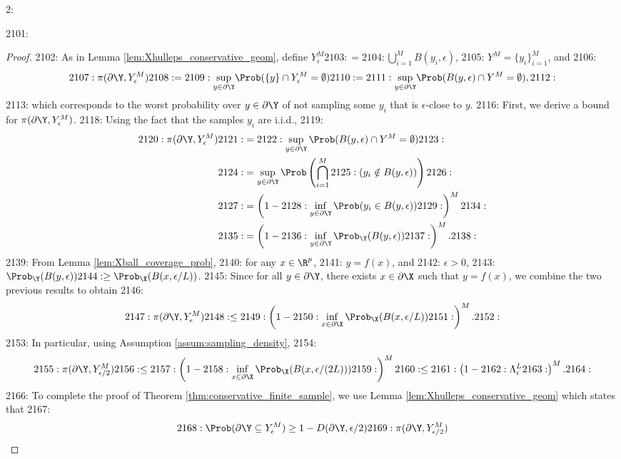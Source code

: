 2: \documentclass[12pt]{l4dc2022} %
\begin{document}
2101: \begin{proof}%
2102: As in Lemma \ref{lem:Xhulleps_conservative_geom}, define $Y_\epsilon^M
2103: 	=
2104: 	\bigcup_{i=1}^M B(y_i,\epsilon)$, 
2105: 	$Y^M=\{y_i\}_{i=1}^M$, and 
2106: $$
2107: \pi(\partial\Y,Y_\epsilon^M)
2108: =
2109: \underset{y\in\partial\Y}{\sup}\Prob(\{y\} \cap Y_\epsilon^M = \emptyset)
2110: =
2111: \underset{y\in\partial\Y}{\sup}\Prob(B(y,\epsilon) \cap Y^M = \emptyset),
2112: $$
2113: which corresponds to the worst probability over $y\in\partial\Y$ of not sampling some $y_i$ that is $\epsilon$-close to $y$. 
2116: First, we derive a bound for $\pi(\partial\Y,Y_\epsilon^M)$. 
2118: Using the fact that the samples $y_i$ are i.i.d., 
2119: \begin{align*}
2120: \pi(\partial\Y,Y_\epsilon^M) 
2121: &=
2122: \sup_{y\in\partial\Y}\Prob(B(y,\epsilon) \cap Y^M = \emptyset)
2123: \\
2124: &= \sup_{y\in\partial\Y}\Prob\left(\bigcap_{i=1}^M
2125: (y_i\notin B(y,\epsilon))\right)
2126: \\
2127: &= \left(1 -
2128: 	\inf_{y\in\partial\Y}\Prob(y_i\in B(y,\epsilon)) 
2129: \right)^M
2134: \\
2135: &=\left(1 -
2136: 	\inf_{y\in\partial\Y}\Prob_\Y(B(y,\epsilon)) 
2137: \right)^M.
2138: \end{align*}
2139: From Lemma \ref{lem:Xball_coverage_prob}, 
2140: for any $x\in\R^p$, 
2141: $y=f(x)$, and 
2142: $\epsilon>0$, 
2143: $\Prob_\Y(B(y,\epsilon))
2144: \geq \Prob_\X(B(x,\epsilon/L))$. 
2145: Since for all $y\in\partial\Y$, there exists $x\in\partial\X$ such that $y=f(x)$, we combine the two previous results to obtain 
2146: \begin{align*}
2147: \pi(\partial\Y,Y_\epsilon^M) 
2148: \leq 
2149: \left(1 -
2150: 	\inf_{x\in\partial\X}\Prob_\X(B(x,\epsilon/L))
2151: \right)^M.
2152: \end{align*}
2153: In particular, using Assumption \ref{assum:sampling_density}, 
2154: \begin{align*}
2155: \pi(\partial\Y,Y_{\epsilon/2}^M) 
2156: \leq 
2157: \left(1 -
2158: 	\inf_{x\in\partial\X}\Prob_\X(B(x,\epsilon/(2L)))
2159: \right)^M
2160: \leq 
2161: \left(1 -
2162: 	\Lambda_{\epsilon}^{L}
2163: \right)^M.
2164: \end{align*}
2166: To complete the proof of Theorem \ref{thm:conservative_finite_sample}, we use Lemma \ref{lem:Xhulleps_conservative_geom} which states that 
2167: $$
2168: \Prob(\partial\Y\subseteq Y_\epsilon^M) \geq 1 - D(\partial\Y,\epsilon/2)
2169: \pi(\partial\Y,Y_{\epsilon/2}^M)
$$
\end{proof}
\end{document}
